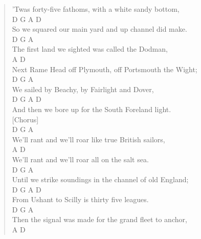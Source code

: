 \documentclass[11pt]{article}
\begin{document}
\begin{verse}
'Twas forty-five fathoms, with a white sandy bottom,\\
\hspace*{6em}D           G                A           D\\
So we squared our main yard and up channel did make.\\
\vspace*{1em}
\hspace*{4em}D                     G              A\\
The first land we sighted was called the Dodman,\\
\hspace*{5em}A                                          D\\
Next Rame Head off Plymouth, off Portsmouth the Wight;\\
\hspace*{3em}D                    G             A\\
We sailed by Beachy, by Fairlight and Dover,\\
\hspace*{4em}D       G               A              D\\
And then we bore up for the South Foreland light.\\
\vspace*{1em}
[Chorus]\\
D                              G            A\\
We'll rant and we'll roar like true British sailors,\\
\hspace*{6em}A                                   D\\
We'll rant and we'll roar all on the salt sea.\\
D                                G              A\\
Until we strike soundings in the channel of old England;\\
\hspace*{5em}D         G         A           D\\
From Ushant to Scilly is thirty five leagues.\\
\vspace*{1em}
\hspace*{9em}D                       G              A\\
Then the signal was made for the grand fleet to anchor,\\
\hspace*{4em}A                                  D\\

\end{verse}
\end{document}

